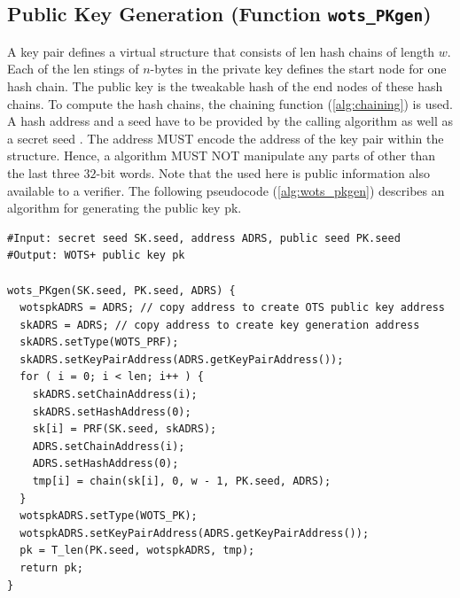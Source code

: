 \subsection{\wotsp Public Key Generation (Function \texttt{wots\_PKgen})}
A \wotsp key pair defines a virtual structure that consists of len hash chains of
length $w$.
Each of the len stings of $n$-bytes in the private key defines the start
node for one hash chain. The public key is the tweakable hash of the end nodes
of these hash chains.
To compute the hash chains, the chaining function
(\autoref{alg:chaining}) is used. A \wotsp hash address \adrs and a seed \pseed have
to be provided by the calling algorithm as well as a secret seed \sseed.
The address \adrs MUST encode the address of
the \wotsp key pair within the \spx structure. Hence, a \wotsp algorithm MUST NOT
manipulate any parts of \adrs other than the last three $32$-bit words.
Note that the \pseed used here is public information also available to a verifier.
The following pseudocode (\autoref{alg:wots_pkgen}) describes an algorithm for
generating the public key pk.

\begin{lstlisting}[label=alg:wots_pkgen, language=pseudoc,
                   caption=\texttt{wots\_PKgen} -- Generating a \wotsp public key.]
#Input: secret seed SK.seed, address ADRS, public seed PK.seed
#Output: WOTS+ public key pk

wots_PKgen(SK.seed, PK.seed, ADRS) {
  wotspkADRS = ADRS; // copy address to create OTS public key address
  skADRS = ADRS; // copy address to create key generation address
  skADRS.setType(WOTS_PRF);
  skADRS.setKeyPairAddress(ADRS.getKeyPairAddress());
  for ( i = 0; i < len; i++ ) {
    skADRS.setChainAddress(i);
    skADRS.setHashAddress(0);
    sk[i] = PRF(SK.seed, skADRS);
    ADRS.setChainAddress(i);
    ADRS.setHashAddress(0);
    tmp[i] = chain(sk[i], 0, w - 1, PK.seed, ADRS);
  }
  wotspkADRS.setType(WOTS_PK);
  wotspkADRS.setKeyPairAddress(ADRS.getKeyPairAddress());
  pk = T_len(PK.seed, wotspkADRS, tmp);
  return pk;
}
\end{lstlisting}

